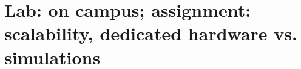 \section{ Lab: on campus; assignment: scalability, dedicated hardware vs. simulations }\label{sec:q1}    
